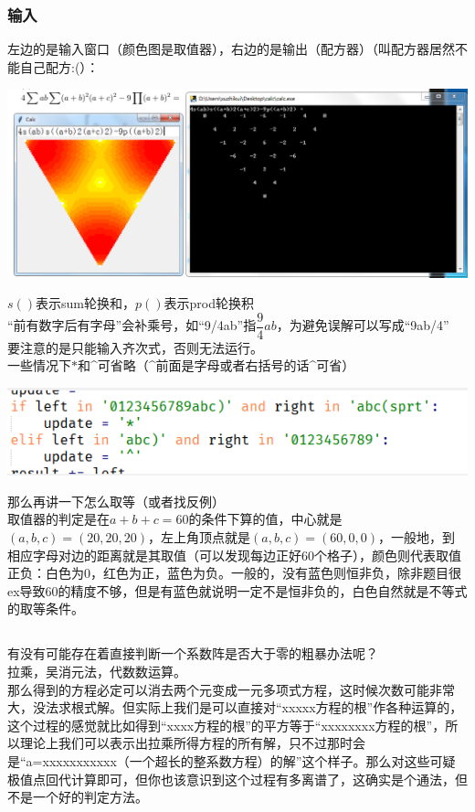 \documentclass[UTF8]{ctexart}
\begin{document}
\subsubsection{输入}
左边的是输入窗口（颜色图是取值器），右边的是输出（配方器）（叫配方器居然不能自己配方:(）：
\begin{center}
	\includegraphics[width=0.85\linewidth]{0020}
\end{center}
$ s() $表示sum轮换和，$ p() $表示prod轮换积\\
“前有数字后有字母”会补乘号，如“9/4ab”指$ \dfrac{9}{4}ab $，为避免误解可以写成“9ab/4”\\
要注意的是只能输入齐次式，否则无法运行。\\
一些情况下$ * $和\^{}可省略（\^{}前面是字母或者右括号的话\^{}可省）
\begin{center}
	\includegraphics[width=0.5\linewidth]{0030}
\end{center}
那么再讲一下怎么取等（或者找反例）\\
取值器的判定是在$ a+b+c=60 $的条件下算的值，中心就是$ (a,b,c)=(20,20,20) $，左上角顶点就是$ (a,b,c)=(60,0,0) $，一般地，到相应字母对边的距离就是其取值（可以发现每边正好60个格子），颜色则代表取值正负：白色为0，红色为正，蓝色为负。一般的，没有蓝色则恒非负，除非题目很ex导致60的精度不够，但是有蓝色就说明一定不是恒非负的，白色自然就是不等式的取等条件。
\subsection{}
有没有可能存在着直接判断一个系数阵是否大于零的粗暴办法呢？\\
拉乘，吴消元法，代数数运算。\\
那么得到的方程必定可以消去两个元变成一元多项式方程，这时候次数可能非常大，没法求根式解。但实际上我们是可以直接对“xxxxx方程的根”作各种运算的，这个过程的感觉就比如得到“xxxx方程的根”的平方等于“xxxxxxxx方程的根”，所以理论上我们可以表示出拉乘所得方程的所有解，只不过那时会是“a=xxxxxxxxxxx（一个超长的整系数方程）的解”这个样子。那么对这些可疑极值点回代计算即可，但你也该意识到这个过程有多离谱了，这确实是个通法，但不是一个好的判定方法。
\end{document}
